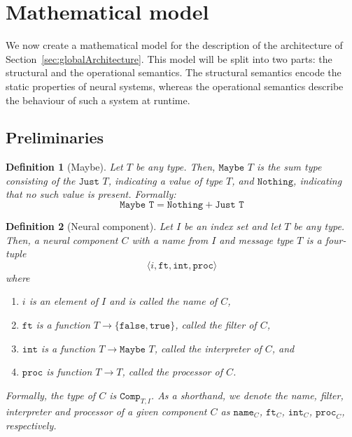 \documentclass[]{scrartcl}
\theoremstyle{break}
\newtheorem{definition}{Definition}
\renewcommand{\tt}[1]{\texttt{#1}}
\begin{document}
\section{Mathematical model}\label{sec:mathematicalModel}

We now create a mathematical model for the description of the architecture of Section~\ref{sec:globalArchitecture}. This model will be split into two parts: the structural and the operational semantics. The structural semantics encode the static properties of neural systems, whereas the operational semantics describe the behaviour of such a system at runtime.

\subsection{Preliminaries}\label{sec:mathematicalPreliminaries}

\begin{definition}[Maybe]
	Let $T$ be any type. Then, $\tt{Maybe } T$ is the sum type consisting of the $\tt{Just } T$, indicating a value of type $T$, and $\tt{Nothing}$, indicating that no such value is present. Formally:
	$$
		\tt{Maybe T} = \tt{Nothing} + \tt{Just T}
	$$ 
\end{definition}

\begin{definition}[Neural component]
	Let $I$ be an index set and let $T$ be any type. Then, a neural component $C$ with a name from $I$ and message type $T$ is a four-tuple
	$$
		\langle i, \tt{ft}, \tt{int}, \tt{proc} \rangle
	$$
	where
	\begin{enumerate}
		\item $i$ is an element of $I$ and is called the {\em name} of $C$,
		\item $\tt{ft}$ is a function $T \rightarrow \{\tt{false}, \tt{true}\}$, called the {\em filter} of $C$,
		\item $\tt{int}$ is a function $T \rightarrow \tt{Maybe } T$, called the {\em interpreter} of $C$, and
		\item $\tt{proc}$ is function $T \rightarrow T$, called the {\em processor} of $C$.
	\end{enumerate}
	
	Formally, the type of $C$ is $\tt{Comp}_{T,I}$. As a shorthand, we denote the name, filter, interpreter and processor of a given component $C$ as $\tt{name}_C$, $\tt{ft}_C$, $\tt{int}_C$, $\tt{proc}_C$, respectively.
\end{definition}
\end{document}
